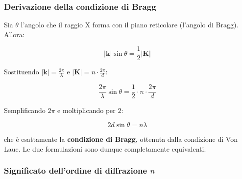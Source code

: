 \vspace{0.5cm}
\begin{center}
\end{center}
\vspace{0.5cm}

\subsubsection{Derivazione della condizione di Bragg}

Sia $\theta$ l'angolo che il raggio X forma con il piano reticolare (l'angolo di Bragg). Allora:

$$|\mathbf{k}|\sin\theta = \frac{1}{2}|\mathbf{K}|$$

Sostituendo $|\mathbf{k}| = \frac{2\pi}{\lambda}$ e $|\mathbf{K}| = n \cdot \frac{2\pi}{d}$:

$$\frac{2\pi}{\lambda}\sin\theta = \frac{1}{2} \cdot n \cdot \frac{2\pi}{d}$$

Semplificando $2\pi$ e moltiplicando per $2$:

$$\boxed{2d\sin\theta = n\lambda}$$

che è esattamente la \textbf{condizione di Bragg}, ottenuta dalla condizione di Von Laue. Le due formulazioni sono dunque completamente equivalenti.

\subsubsection{Significato dell'ordine di diffrazione $n$}

